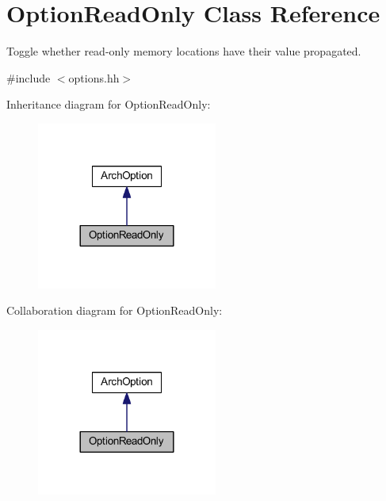 \hypertarget{class_option_read_only}{}\section{Option\+Read\+Only Class Reference}
\label{class_option_read_only}


Toggle whether read-\/only memory locations have their value propagated.  




{\ttfamily \#include $<$options.\+hh$>$}



Inheritance diagram for Option\+Read\+Only\+:
\nopagebreak
\begin{figure}[H]
\begin{center}
\leavevmode
\includegraphics[width=168pt]{class_option_read_only__inherit__graph}
\end{center}
\end{figure}


Collaboration diagram for Option\+Read\+Only\+:
\nopagebreak
\begin{figure}[H]
\begin{center}
\leavevmode
\includegraphics[width=168pt]{class_option_read_only__coll__graph}
\end{center}
\end{figure}
